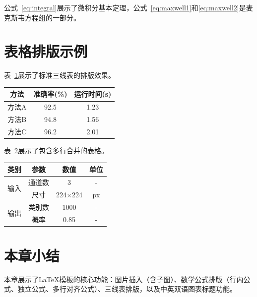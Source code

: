公式~\eqref{eq:integral}展示了微积分基本定理，公式~\eqref{eq:maxwell1}和\eqref{eq:maxwell2}是麦克斯韦方程组的一部分。

\section{表格排版示例}

表~\ref{tab:three-line}展示了标准三线表的排版效果。

\begin{table}[htbp]
    \centering
    \label{tab:three-line}
    \begin{tabular}{ccc}
        \toprule
        \textbf{方法} & \textbf{准确率(\%)} & \textbf{运行时间(s)} \\
        \midrule
        方法A & 92.5 & 1.23 \\
        方法B & 94.8 & 1.56 \\
        方法C & 96.2 & 2.01 \\
        \bottomrule
    \end{tabular}
\end{table}

表~\ref{tab:multi-row}展示了包含多行合并的表格。

\begin{table}[htbp]
    \centering
    \label{tab:multi-row}
    \begin{tabular}{cccc}
        \toprule
        \textbf{类别} & \textbf{参数} & \textbf{数值} & \textbf{单位} \\
        \midrule
        \multirow{2}{*}{输入} & 通道数 & 3 & - \\
                              & 尺寸 & 224$\times$224 & px \\
        \midrule
        \multirow{2}{*}{输出} & 类别数 & 1000 & - \\
                              & 概率 & 0.85 & - \\
        \bottomrule
    \end{tabular}
\end{table}

\section{本章小结}

本章展示了LaTeX模板的核心功能：图片插入（含子图）、数学公式排版（行内公式、独立公式、多行对齐公式）、三线表排版，以及中英双语图表标题功能。
